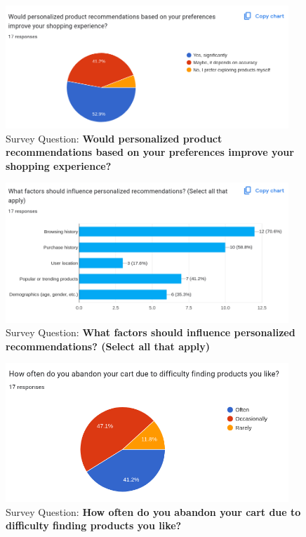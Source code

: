 \documentclass[12pt]{report}
\begin{document}
\begin{appendices}
	\begin{figure}[H]
		\begin{center}
			\includegraphics[width=0.95\textwidth]{survey/q6}
		\end{center}
		\caption{Survey Question: \textbf{Would personalized product recommendations based on your preferences improve your shopping experience?}}
	\end{figure}

	\begin{figure}[H]
		\begin{center}
			\includegraphics[width=0.95\textwidth]{survey/q7}
		\end{center}
		\caption{Survey Question: \textbf{What factors should influence personalized recommendations? (Select all that apply)}}
	\end{figure}

	\begin{figure}[H]
		\begin{center}
			\includegraphics[width=0.95\textwidth]{survey/q8}
		\end{center}
		\caption{Survey Question: \textbf{How often do you abandon your cart due to difficulty finding products you like?}}
	\end{figure}


\end{appendices}
\end{document}
